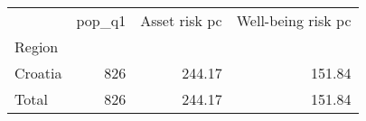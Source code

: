 \begin{tabular}{lrrr}
\toprule
{} &  pop\_q1 &  Asset risk pc &  Well-being risk pc \\
Region  &         &                &                     \\
\midrule
Croatia &     826 &         244.17 &              151.84 \\
Total   &     826 &         244.17 &              151.84 \\
\bottomrule
\end{tabular}
